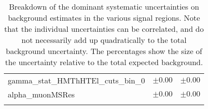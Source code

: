 \begin{table}
\begin{center}
\begin{tabular*}{\textwidth}{@{\extracolsep{\fill}}lcc}
gamma\_stat\_HMThHTEl\_cuts\_bin\_0         & $\pm 0.00$          & $\pm 0.00$       \\
alpha\_muonMSRes         & $\pm 0.00$          & $\pm 0.00$       \\
\noalign{\smallskip}\hline\noalign{\smallskip}
\end{tabular*}
\end{center}
\caption[Breakdown of uncertainty on background estimates]{
Breakdown of the dominant systematic uncertainties on background estimates in the various signal regions.
Note that the individual uncertainties can be correlated, and do not necessarily add up quadratically to 
the total background uncertainty. The percentages show the size of the uncertainty relative to the total expected background.
\label{table.results.bkgestimate.uncertainties.HMEThHTEl_HMEThHTMu}}
\end{table}
%